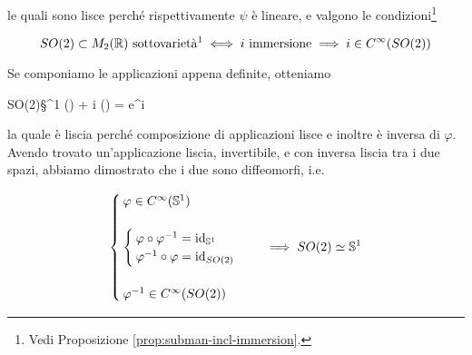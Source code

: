 {le quali sono lisce perché rispettivamente $ \psi $ è lineare, e valgono le condizioni\footnote{%
	Vedi Proposizione \ref{prop:subman-incl-immersion}.%
}

\begin{equation}
	SO(2) \subset M_{2}(\R) \text{ sottovarietà\footnotemark} %
	\iff %
	i \text{ immersione} %
	\implies %
	i \in C^{\infty}(SO(2))
\end{equation}

Se componiamo le applicazioni appena definite, otteniamo

	{SO(2)}{\S^{1}}
	{\bmqty{ \cos(\theta) & \sin(\theta) \\ -\sin(\theta) & \cos(\theta) }}
	{\cos(\theta) + i \sin(\theta) = e^{i \theta}}

la quale è liscia perché composizione di applicazioni lisce e inoltre è inversa di $ \varphi $. Avendo trovato un'applicazione liscia, invertibile, e con inversa liscia tra i due spazi, abbiamo dimostrato che i due sono diffeomorfi, i.e.

\begin{equation}
	\begin{cases}
		\varphi \in C^{\infty}(\S^{1}) \\ \\
		\begin{cases}
			\varphi \circ \varphi^{-1} = \id_{\S^{1}} \\
			\varphi^{-1} \circ \varphi = \id_{SO(2)}
		\end{cases} \\ \\
		\varphi^{-1} \in C^{\infty}(SO(2))
	\end{cases}
	\implies %
	SO(2) \simeq \S^{1}
\end{equation}
}


